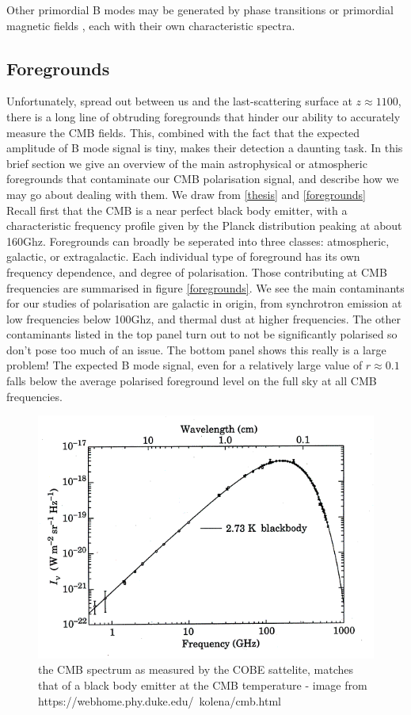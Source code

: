 \documentclass[a4paper,10pt]{article}
\begin{document}
Other primordial B modes may be generated by phase transitions \cite{phase} or primordial magnetic fields \cite{magnetic}, each with their own characteristic spectra.

\subsection{Foregrounds}

Unfortunately, spread out between us and the last-scattering surface at $z\approx 1100$, there is a long line of obtruding foregrounds that hinder our ability to accurately measure the CMB fields. This, combined with the fact that the expected amplitude of B mode signal is tiny, makes their detection a daunting task. In this brief section we give an overview of the main astrophysical or atmospheric foregrounds that contaminate our CMB polarisation signal, and describe how we may go about dealing with them. We draw from \ref{thesis} and \ref{foregrounds}\\

Recall first that the CMB is a near perfect black body emitter, with a characteristic frequency profile given by the Planck distribution peaking at about 160Ghz. Foregrounds can broadly be seperated into three classes: atmospheric, galactic, or extragalactic. Each individual type of foreground has its own frequency dependence, and degree of polarisation. Those contributing at CMB frequencies are summarised in figure \ref{foregrounds}. We see the main contaminants for our studies of polarisation are galactic in origin, from synchrotron emission at low frequencies below 100Ghz, and thermal dust at higher frequencies. The other contaminants listed in the top panel turn out to not be significantly polarised so don't pose too much of an issue. The bottom panel shows this really is a large problem! The expected B mode signal, even for a relatively large value of $r\approx0.1$ falls below the average polarised foreground level on the full sky at all CMB frequencies.\\

\begin{figure}[h]
  \includegraphics[width=0.4\linewidth]{cmbspectrum1.png}
  \centering
  \caption{the CMB spectrum as measured by the COBE sattelite, matches that of a black body emitter at the CMB temperature - image from https://webhome.phy.duke.edu/~kolena/cmb.html  }
\end{figure}
\end{document}
